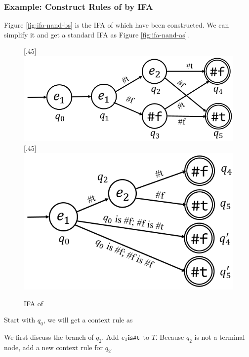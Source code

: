\subsubsection{Example: Construct Rules of  by IFA}

Figure \ref{fig:ifa-nand-bs} is the IFA of  which have been constructed. We can simplify it and get a standard IFA as Figure \ref{fig:ifa-nand-as}.

\begin{figure}[t]
\centering
{}[.45\linewidth]{
    \includegraphics[scale=0.28]{images/ifa-nand-4.png}
}
[.45\linewidth]{
    \includegraphics[scale=0.28]{images/ifa-nand.png}
}
\caption{IFA of }
\label{fig:ifa-nand-std}
\end{figure}

Start with $q_0$, we will get a context rule as


We first discuss the branch of $q_2$. Add $e_1 \mbox{\rm \bf is} \mbox{\tt \#t}$ to $T$. Because $q_2$ is not a terminal node, add a new context rule for $q_2$.

